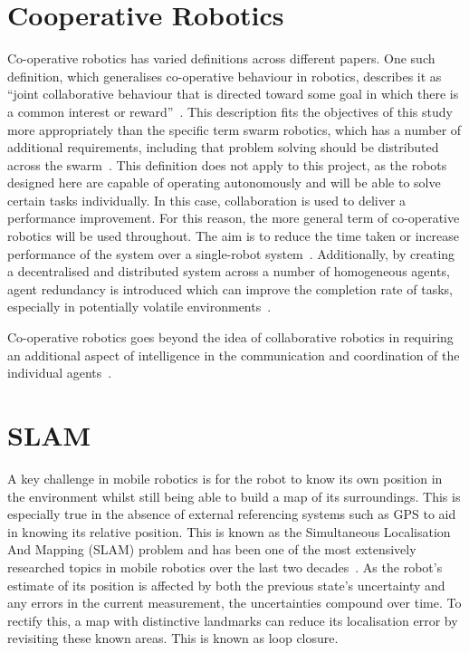 \section{Cooperative Robotics}\label{litreview/coop}
Co-operative robotics has varied definitions across different papers. One such
definition, which generalises co-operative behaviour in robotics, describes it as ``joint
collaborative behaviour that is directed toward some goal in which there is a
common interest or reward''~\cite{barnes1991behaviour}. This description fits the
objectives of this study more appropriately than the specific term swarm robotics, which
has a number of additional requirements, including
that problem solving should be distributed across the swarm~\cite{sahin04}.
This definition does not apply to this project, as the robots designed
here are capable of operating autonomously and will be able to solve certain tasks
individually. In this case, collaboration is used to deliver a performance improvement.
For this reason, the more general term of co-operative robotics will
be used throughout. The aim is to reduce the time taken or increase performance of the system over
a single-robot system~\cite{premvuti1990consideration}. Additionally, by creating a decentralised
and distributed system across a number of homogeneous agents, agent redundancy is introduced which
can improve the completion rate of tasks, especially in potentially volatile
environments~\cite{beckers1994local, parker95}.

Co-operative robotics goes beyond the idea
of collaborative robotics in requiring an additional aspect of intelligence in
the communication and coordination of the individual agents~\cite{cao1995cooperative}.

\section{SLAM}\label{litreview/slam}
A key challenge in mobile robotics is for the robot to know its own position in the
environment whilst still being able to build a map of its surroundings. 
This is especially true in the absence of external referencing systems
such as GPS to aid in knowing its relative position. This is known as the Simultaneous Localisation And Mapping (SLAM)
problem and has been one of the most extensively researched topics in mobile
robotics over the last two decades~\cite{grisetti2010tutorial}. As the robot's
estimate of its position is affected by both the previous state's uncertainty
and any errors in the current measurement, the uncertainties compound
over time. To rectify this, a map with distinctive landmarks can reduce its
localisation error by revisiting these known areas. This is known as loop closure.

